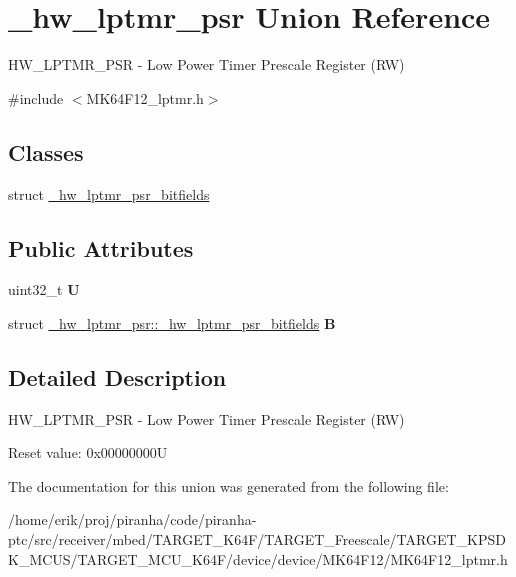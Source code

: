 \hypertarget{union__hw__lptmr__psr}{}\section{\+\_\+hw\+\_\+lptmr\+\_\+psr Union Reference}
\label{union__hw__lptmr__psr}


H\+W\+\_\+\+L\+P\+T\+M\+R\+\_\+\+P\+SR -\/ Low Power Timer Prescale Register (RW)  




{\ttfamily \#include $<$M\+K64\+F12\+\_\+lptmr.\+h$>$}

\subsection*{Classes}
\begin{DoxyCompactItemize}
\item 
struct \hyperlink{struct__hw__lptmr__psr_1_1__hw__lptmr__psr__bitfields}{\+\_\+hw\+\_\+lptmr\+\_\+psr\+\_\+bitfields}
\end{DoxyCompactItemize}
\subsection*{Public Attributes}
\begin{DoxyCompactItemize}
\item 
uint32\+\_\+t {\bfseries U}\hypertarget{union__hw__lptmr__psr_a5662daca28d8f330c20ed038dc1e376c}{}\label{union__hw__lptmr__psr_a5662daca28d8f330c20ed038dc1e376c}

\item 
struct \hyperlink{struct__hw__lptmr__psr_1_1__hw__lptmr__psr__bitfields}{\+\_\+hw\+\_\+lptmr\+\_\+psr\+::\+\_\+hw\+\_\+lptmr\+\_\+psr\+\_\+bitfields} {\bfseries B}\hypertarget{union__hw__lptmr__psr_abc5993110479143caebbb1ab79f3a088}{}\label{union__hw__lptmr__psr_abc5993110479143caebbb1ab79f3a088}

\end{DoxyCompactItemize}


\subsection{Detailed Description}
H\+W\+\_\+\+L\+P\+T\+M\+R\+\_\+\+P\+SR -\/ Low Power Timer Prescale Register (RW) 

Reset value\+: 0x00000000U 

The documentation for this union was generated from the following file\+:\begin{DoxyCompactItemize}
\item 
/home/erik/proj/piranha/code/piranha-\/ptc/src/receiver/mbed/\+T\+A\+R\+G\+E\+T\+\_\+\+K64\+F/\+T\+A\+R\+G\+E\+T\+\_\+\+Freescale/\+T\+A\+R\+G\+E\+T\+\_\+\+K\+P\+S\+D\+K\+\_\+\+M\+C\+U\+S/\+T\+A\+R\+G\+E\+T\+\_\+\+M\+C\+U\+\_\+\+K64\+F/device/device/\+M\+K64\+F12/M\+K64\+F12\+\_\+lptmr.\+h\end{DoxyCompactItemize}
